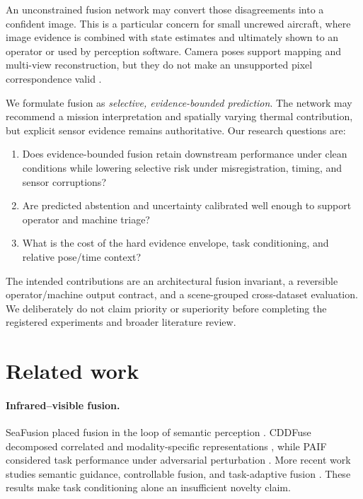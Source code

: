 \documentclass[10pt]{article}
\begin{document}
An unconstrained fusion network may convert those disagreements into a
confident image. This is a particular concern for small uncrewed aircraft,
where image evidence is combined with state estimates and ultimately shown to
an operator or used by perception software. Camera poses support mapping and
multi-view reconstruction, but they do not make an unsupported pixel
correspondence valid \citep{carlone2020vnav}.

We formulate fusion as \emph{selective, evidence-bounded prediction}. The
network may recommend a mission interpretation and spatially varying thermal
contribution, but explicit sensor evidence remains authoritative. Our research
questions are:

\begin{enumerate}
  \item Does evidence-bounded fusion retain downstream performance under clean
  conditions while lowering selective risk under misregistration, timing, and
  sensor corruptions?
  \item Are predicted abstention and uncertainty calibrated well enough to
  support operator and machine triage?
  \item What is the cost of the hard evidence envelope, task conditioning, and
  relative pose/time context?
\end{enumerate}

The intended contributions are an architectural fusion invariant, a reversible
operator/machine output contract, and a scene-grouped cross-dataset evaluation.
We deliberately do not claim priority or superiority before completing the
registered experiments and broader literature review.

\section{Related work}

\paragraph{Infrared--visible fusion.}
SeaFusion placed fusion in the loop of semantic perception
\citep{tang2022seafusion}. CDDFuse decomposed correlated and modality-specific
representations \citep{zhao2023cddfuse}, while PAIF considered task performance
under adversarial perturbation \citep{liu2023paif}. More recent work studies
semantic guidance, controllable fusion, and task-adaptive fusion
\citep{zhang2024semantic,yang2026customized,guo2026confusion}. These results
make task conditioning alone an insufficient novelty claim.
\end{document}

